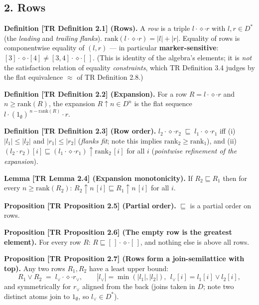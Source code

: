 \documentclass[
  10pt,
  letterpaper,
]{article}
\begin{document}
\subsection{2. Rows}\label{rows}

\textbf{Definition {[}TR Definition 2.1{]} (Rows).} A \emph{row} is a
triple \(l \cdot \diamond \cdot r\) with \(l, r \in D^{*}\) (the
\emph{leading} and \emph{trailing flanks}).
\(\mathrm{rank}(l \cdot \diamond \cdot r) = |l| + |r|\). Equality of
rows is componentwise equality of \((l, r)\) --- in particular
\textbf{marker-sensitive}:
\([3]\cdot\diamond\cdot[4] \ne [3,4]\cdot\diamond\cdot[\,]\). (This is
identity of the algebra's elements; it is \emph{not} the satisfaction
relation of equality \emph{constraints}, which TR Definition 3.4 judges
by the flat equivalence \(\approx\) of TR Definition 2.8.)

\textbf{Definition {[}TR Definition 2.2{]} (Expansion).} For a row
\(R = l \cdot \diamond \cdot r\) and \(n \ge \mathrm{rank}(R)\), the
expansion \(R{\uparrow}n \in D^{n}\) is the flat sequence
\(l \cdot (1_\emptyset)^{\,n - \mathrm{rank}(R)} \cdot r\).

\textbf{Definition {[}TR Definition 2.3{]} (Row order).}
\(l_2 \cdot \diamond \cdot r_2 \;\sqsubseteq\; l_1 \cdot \diamond \cdot r_1\)
iff (i) \(|l_1| \le |l_2|\) and \(|r_1| \le |r_2|\) (\emph{flanks fit};
note this implies \(\mathrm{rank}_2 \ge \mathrm{rank}_1\)), and (ii)
\((l_2 \cdot r_2)[i] \sqsubseteq (l_1\cdot\diamond\cdot r_1){\uparrow}\mathrm{rank}_2\,[i]\)
for all \(i\) (\emph{pointwise refinement of the expansion}).

\textbf{Lemma {[}TR Lemma 2.4{]} (Expansion monotonicity).} If
\(R_2 \sqsubseteq R_1\) then for every \(n \ge \mathrm{rank}(R_2)\):
\(R_2{\uparrow}n\,[i] \sqsubseteq R_1{\uparrow}n\,[i]\) for all \(i\).

\textbf{Proposition {[}TR Proposition 2.5{]} (Partial order).}
\(\sqsubseteq\) is a partial order on rows.

\textbf{Proposition {[}TR Proposition 2.6{]} (The empty row is the
greatest element).} For every row \(R\):
\(R \sqsubseteq [\,]\cdot\diamond\cdot[\,]\), and nothing else is above
all rows.

\textbf{Proposition {[}TR Proposition 2.7{]} (Rows form a
join-semilattice with top).} Any two rows \(R_1, R_2\) have a least
upper bound:
\[R_1 \vee R_2 \;=\; l_\vee \cdot \diamond \cdot r_\vee, \qquad |l_\vee| = \min(|l_1|,|l_2|),\ \ l_\vee[i] = l_1[i] \vee l_2[i],\]
and symmetrically for \(r_\vee\) aligned from the back (joins taken in
\(D\); note two distinct atoms join to \(1_\emptyset\), so
\(l_\vee \in D^{*}\)).
\end{document}

